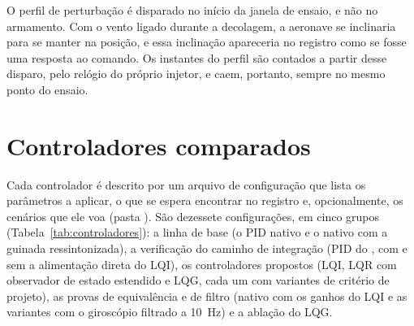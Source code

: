 O perfil de perturbação é disparado no início da janela de ensaio, e não no
armamento. Com o vento ligado durante a decolagem, a aeronave se inclinaria
para se manter na posição, e essa inclinação apareceria no registro como se
fosse uma resposta ao comando. Os instantes do perfil são contados a partir
desse disparo, pelo relógio do próprio injetor, e caem, portanto, sempre no
mesmo ponto do ensaio.

\section{Controladores comparados}
\label{sec:controladores}

Cada controlador é descrito por um arquivo de configuração que lista os
parâmetros a aplicar, o que se espera encontrar no registro e,
opcionalmente, os cenários que ele voa (pasta
). São dezessete configurações, em cinco
grupos (Tabela~\ref{tab:controladores}): a linha de base (o PID nativo e o
nativo com a guinada ressintonizada), a verificação do caminho de integração
(PID do , com e sem a alimentação direta do LQI),
os controladores propostos (LQI, LQR com observador de estado estendido e
LQG, cada um com variantes de critério de projeto), as provas de
equivalência e de filtro (nativo com os ganhos do LQI e as variantes com o
giroscópio filtrado a \SI{10}{\hertz}) e a ablação do LQG.

